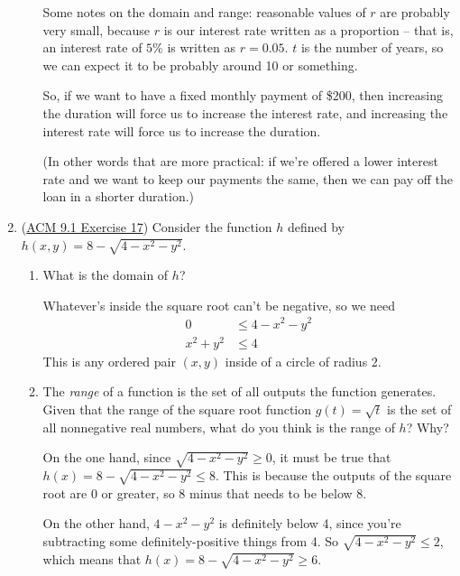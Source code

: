 \documentclass[10pt]{article}
\newenvironment{red}{\color{red}}{\ignorespacesafterend}
\begin{document}
\begin{enumerate}[leftmargin=0pt]
\begin{enumerate}
\begin{red}
        Some notes on the domain and range: reasonable values of $r$ are probably very small, because $r$ is our interest rate written as a proportion -- that is, an interest rate of $5\%$ is written as $r = 0.05$. $t$ is the number of years, so we can expect it to be probably around 10 or something.
        
        So, if we want to have a fixed monthly payment of \$200, then increasing the duration will force us to increase the interest rate, and increasing the interest rate will force us to increase the duration.
        
        (In other words that are more practical: if we're offered a lower interest rate and we want to keep our payments the same, then we can pay off the loan in a shorter duration.)
        \end{red}
    \end{enumerate}
    \item (\href{https://activecalculus.org/multi/S-9-1-Functions.html#Ez-9-1-3}{ACM 9.1 Exercise 17}) Consider the function $h$ defined by $h(x,y) = 8-\sqrt{4-x^2-y^2}$.
    \begin{enumerate}
        \item What is the domain of $h$?

        \begin{red}
            Whatever's inside the square root can't be negative, so we need
            \begin{align*}
                0 &\leq 4 - x^2 - y^2 \\
                x^2 + y^2 &\leq 4
            \end{align*}
            This is any ordered pair $(x,y)$ inside of a circle of radius 2.
        \end{red}

        \item The \textit{range} of a function is the set of all outputs the function generates. Given that the range of the square root function $g(t) = \sqrt{t}$ is the set of all nonnegative real numbers, what do you think is the range of $h$? Why?

        \begin{red}
            On the one hand, since $\sqrt{4-x^2-y^2} \geq 0$, it must be true that $h(x) = 8-\sqrt{4-x^2-y^2} \leq 8$. This is because the outputs of the square root are 0 or greater, so 8 minus that needs to be below 8.

            On the other hand, $4-x^2-y^2$ is definitely below 4, since you're subtracting some definitely-positive things from 4. So $\sqrt{4-x^2-y^2} \leq 2$, which means that $h(x) = 8 - \sqrt{4-x^2-y^2} \geq 6$.


\end{red}
\end{enumerate}
\end{enumerate}
\end{document}

